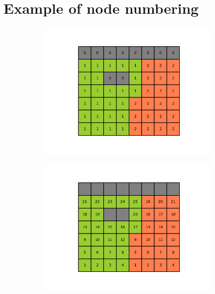 \documentclass[11pt,a4paper]{report}
\begin{document}
\section{Example of node numbering}
\begin{figure}[h]
	\begin{subfigure}{0.32\textwidth}
		\includegraphics[width=1.2\textwidth]{./Figures/geo_plot01.png}
	\end{subfigure}
	\begin{subfigure}{0.32\textwidth}
	\includegraphics[width=1.2\textwidth]{./Figures/geo_plot02.png}
    \end{subfigure}
	\begin{subfigure}{0.32\textwidth}

\end{subfigure}
\end{figure}
\end{document}
